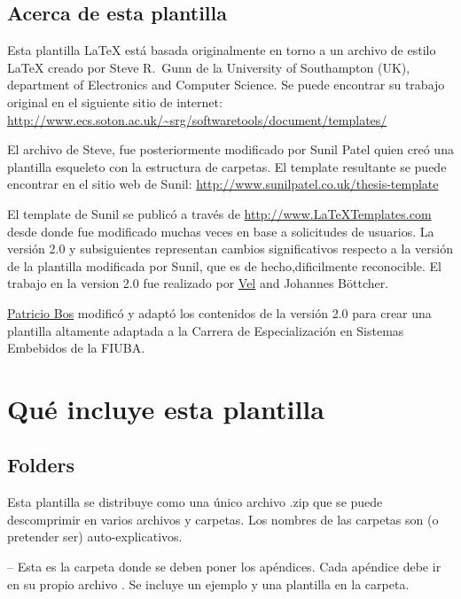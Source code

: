\subsection{Acerca de esta plantilla}

Esta plantilla \LaTeX{} está basada originalmente en torno a un archivo de estilo \LaTeX{} creado por Steve R.\ Gunn de la  University of Southampton (UK), department of Electronics and Computer Science. Se puede encontrar su trabajo original en el siguiente sitio de internet:
\url{http://www.ecs.soton.ac.uk/~srg/softwaretools/document/templates/}

El archivo de Steve,  fue posteriormente modificado por Sunil Patel quien creó una plantilla esqueleto con la estructura de carpetas. El template resultante se puede encontrar en el sitio web de Sunil:
\url{http://www.sunilpatel.co.uk/thesis-template}

El template de Sunil se publicó a través de  \url{http://www.LaTeXTemplates.com} desde donde fue modificado muchas veces en base a solicitudes de usuarios. La versión 2.0 y subsiguientes representan cambios significativos respecto a la versión de la plantilla modificada por Sunil, que es de hecho,dificilmente reconocible. El trabajo en la version 2.0 fue realizado por  \href{mailto:vel@latextemplates.com}{Vel} and Johannes Böttcher.

\href{mailto:pbos@fi.uba.ar}{Patricio Bos} modificó y adaptó los contenidos de la versión 2.0 para crear una plantilla altamente adaptada a la Carrera de Especialización en Sistemas Embebidos de la FIUBA.


\section{Qué incluye esta plantilla}

\subsection{Folders}

Esta plantilla se distribuye como una único archivo .zip que se puede descomprimir en varios archivos y carpetas. Los nombres de las carpetas son (o pretender ser) auto-explicativos.

 -- Esta es la carpeta donde se deben poner los apéndices. Cada apéndice debe ir en su propio archivo . Se incluye un ejemplo y una plantilla en la carpeta.

